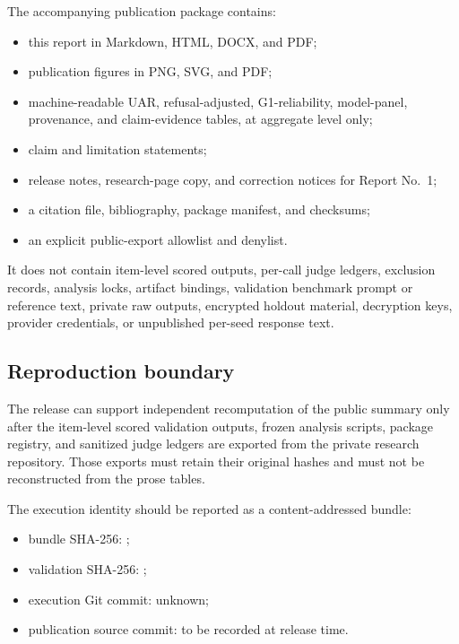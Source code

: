 \documentclass[9pt,letterpaper,twocolumn]{extarticle}
\providecommand{\tightlist}{\setlength{\itemsep}{0pt}\setlength{\parskip}{0pt}}
\begin{document}
The accompanying publication package contains:

\begin{itemize}
\tightlist
\item
  this report in Markdown, HTML, DOCX, and PDF;
\item
  publication figures in PNG, SVG, and PDF;
\item
  machine-readable UAR, refusal-adjusted, G1-reliability, model-panel,
  provenance, and claim-evidence tables, at aggregate level only;
\item
  claim and limitation statements;
\item
  release notes, research-page copy, and correction notices for Report
  No.~1;
\item
  a citation file, bibliography, package manifest, and checksums;
\item
  an explicit public-export allowlist and denylist.
\end{itemize}

It does not contain item-level scored outputs, per-call judge ledgers,
exclusion records, analysis locks, artifact bindings, validation
benchmark prompt or reference text, private raw outputs, encrypted
holdout material, decryption keys, provider credentials, or unpublished
per-seed response text.

\subsection{Reproduction boundary}\label{reproduction-boundary}

The release can support independent recomputation of the public summary
only after the item-level scored validation outputs, frozen analysis
scripts, package registry, and sanitized judge ledgers are exported from
the private research repository. Those exports must retain their
original hashes and must not be reconstructed from the prose tables.

The execution identity should be reported as a content-addressed bundle:

\begin{itemize}
\tightlist
\item
  bundle SHA-256:
  \texttt{};
\item
  validation SHA-256:
  \texttt{};
\item
  execution Git commit: unknown;
\item
  publication source commit: to be recorded at release time.
\end{itemize}
\end{document}

